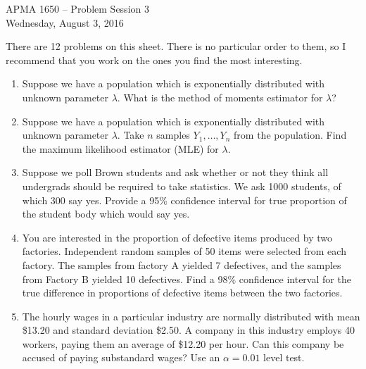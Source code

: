 \documentclass[12pt]{article}
\begin{document}
\title{}
\author{\vspace{-10ex} }

\begin{center}
{\LARGE APMA 1650 -- Problem Session 3}\\
\vspace{5mm}
{\large Wednesday, August 3, 2016}\\
\end{center}

There are 12 problems on this sheet. There is no particular order to them, so I recommend that you work on the ones you find the most interesting.

\begin{enumerate}

\item Suppose we have a population which is exponentially distributed with unknown parameter $\lambda$. What is the method of moments estimator for $\lambda$?

\item Suppose we have a population which is exponentially distributed with unknown parameter $\lambda$. Take $n$ samples $Y_1, \dots, Y_n$ from the population. Find the maximum likelihood estimator (MLE) for $\lambda$.

\item Suppose we poll Brown students and ask whether or not they think all undergrads should be required to take statistics. We ask 1000 students, of which 300 say yes. Provide a 95\% confidence interval for true proportion of the student body which would say yes.

\item You are interested in the proportion of defective items produced by two factories. Independent random samples of 50 items were selected from each factory. The samples from factory A yielded 7 defectives, and the samples from Factory B yielded 10 defectives. Find a 98\% confidence interval for the true difference in proportions of defective items between the two factories.

\item The hourly wages in a particular industry are normally distributed with mean \$13.20 and standard deviation \$2.50. A company in this industry employs 40 workers, paying them an average of \$12.20 per hour. Can this company be accused of paying substandard wages? Use an $\alpha = 0.01$ level test. 


\end{enumerate}
\end{document}
